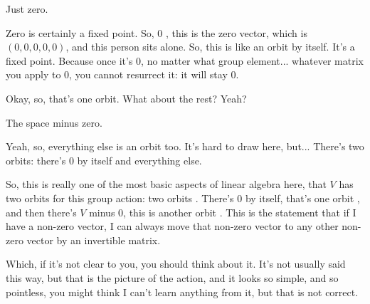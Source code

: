 \begin{student}
Just zero.
\end{student}

\begin{speech}[01:11:18 - 01:11:47]
Zero is certainly a fixed point. So, $0$ , this is the zero vector, which is $(0, 0, 0, 0, 0)$, and this person sits alone. So, this is like an orbit by itself. It's a fixed point. Because once it's $0$, no matter what group element... whatever matrix you apply to $0$, you cannot resurrect it: it will stay $0$.

Okay, so, that's one orbit. What about the rest? Yeah?
\end{speech}

\begin{student}
The space minus zero.
\end{student}

\begin{speech}[01:11:50 - 01:12:40]
Yeah, so, everything else is an orbit too. It's hard to draw here, but...  There's two orbits: there's $0$ by itself and everything else.

So, this is really one of the most basic aspects of linear algebra here, that $V$ has two orbits for this group action: two orbits . There's $0$ by itself, that's one orbit , and then there's $V$ minus $0$, this is another orbit . This is the statement that if I have a non-zero vector, I can always move that non-zero vector to any other non-zero vector by an invertible matrix.

Which, if it's not clear to you, you should think about it. It's not usually said this way, but that is the picture of the action, and it looks so simple, and so pointless, you might think I can't learn anything from it, but that is not correct.
\end{speech}


